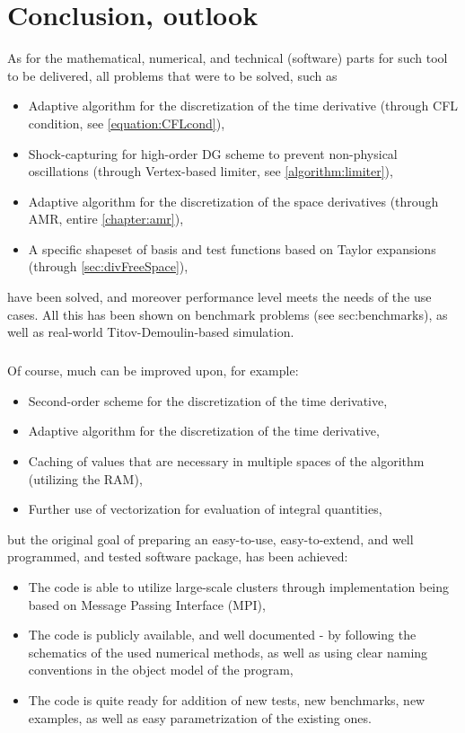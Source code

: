 \chapter{Conclusion, outlook}
As for the mathematical, numerical, and technical (software) parts for such tool to be delivered, all problems that were to be solved, such as
\begin{itemize}
	\item Adaptive algorithm for the discretization of the time derivative (through CFL condition, see \cref{equation:CFLcond}),
	\item Shock-capturing for high-order DG scheme to prevent non-physical oscillations (through Vertex-based limiter, see \cref{algorithm:limiter}),
	\item Adaptive algorithm for the discretization of the space derivatives (through AMR, entire \cref{chapter:amr}),
	\item A specific shapeset of basis and test functions based on Taylor expansions (through \cref{sec:divFreeSpace}),
\end{itemize}
have been solved, and moreover performance level meets the needs of the use cases. All this has been shown on benchmark problems (see {sec:benchmarks}), as well as real-world Titov-Demoulin-based simulation.
\paragraph{}
Of course, much can be improved upon, for example:
\begin{itemize}
	\item Second-order scheme for the discretization of the time derivative,
	\item Adaptive algorithm for the discretization of the time derivative,
	\item Caching of values that are necessary in multiple spaces of the algorithm (utilizing the RAM),
	\item Further use of vectorization for evaluation of integral quantities,
\end{itemize}
but the original goal of preparing an easy-to-use, easy-to-extend, and well programmed, and tested software package, has been achieved:
\begin{itemize}
\item The code is able to utilize large-scale clusters through implementation being based on Message Passing Interface (MPI),
\item The code is publicly available, and well documented - by following the schematics of the used numerical methods, as well as using clear naming conventions in the object model of the program,
\item The code is quite ready for addition of new tests, new benchmarks, new examples, as well as easy parametrization of the existing ones.
\end{itemize}

